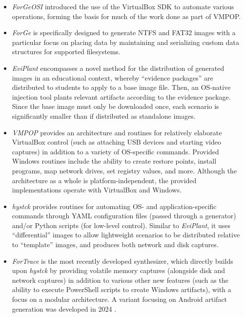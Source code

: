 \documentclass[letterpaper,12pt]{report}
\def\tightlist{}
\begin{document}
\begin{itemize}
\tightlist
\item
  \emph{ForGeOSI} \cite{maxfraggMaxfraggForGeOSI2023} introduced the
  use of the VirtualBox SDK to automate various operations, forming the
  basis for much of the work done as part of VMPOP.
\item
  \emph{ForGe} \cite{vistiAutomaticCreationComputer2015} is
  specifically designed to generate NTFS and FAT32 images with a
  particular focus on placing data by maintaining and serializing custom
  data structures for supported filesystems.
\item
  \emph{EviPlant} \cite{scanlonEviPlantEfficientDigital2017}
  encompasses a novel method for the distribution of generated images in
  an educational context, whereby ``evidence packages'' are distributed
  to students to apply to a base image file. Then, an OS-native
  injection tool plants relevant artifacts according to the evidence
  package. Since the base image must only be downloaded once, each
  scenario is significantly smaller than if distributed as standalone
  images.
\item
  \emph{VMPOP} \cite{parkTREDEVMPOPCultivating2018} provides an
  architecture and routines for relatively elaborate VirtualBox control
  (such as attaching USB devices and starting video captures) in
  addition to a variety of OS-specific commands. Provided Windows
  routines include the ability to create restore points, install
  programs, map network drives, set registry values, and more. Although
  the architecture as a whole is platform-independent, the provided
  implementations operate with VirtualBox and Windows.
\item
  \emph{hystck} \cite{gobelNovelApproachGenerating2020} provides
  routines for automating OS- and application-specific commands through
  YAML configuration files (passed through a generator) and/or Python
  scripts (for low-level control). Similar to \emph{EviPlant}, it uses
  ``differential'' images to allow lightweight scenarios to be
  distributed relative to ``template'' images, and produces both network
  and disk captures.
\item
  \emph{ForTrace} \cite{gobelForTraceHolisticForensic2022} is the
  most recently developed synthesizer, which directly builds upon
  \emph{hystck} by providing volatile memory captures (alongside disk
  and network captures) in addition to various other new features (such
  as the ability to execute PowerShell scripts to create Windows
  artifacts), with a focus on a modular architecture. A variant focusing
  on Android artifact generation was developed in 2024
  \cite{demmelDataSynthesisGoing2024}.
\end{itemize}
\end{document}
